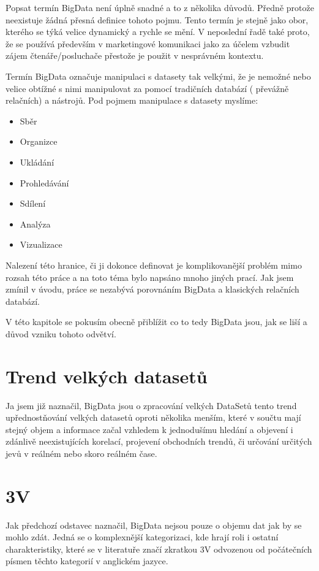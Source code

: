 

Popsat termín BigData není úplně snadné a to z několika důvodů. Předně protože neexistuje žádná přesná definice tohoto pojmu. Tento termín je stejně jako obor, kterého se týká velice dynamický a rychle se mění. V neposlední řadě také proto, že se používá především v marketingové komunikaci jako  za účelem vzbudit zájem čtenáře/posluchače přestože je použit v nesprávném kontextu.

Termín BigData označuje manipulaci s datasety tak velkými, že je nemožné nebo velice obtížné  s nimi manipulovat za pomocí tradičních databází ( převážně relačních) a nástrojů. Pod pojmem manipulace s datasety myslíme:

\begin{itemize}
  \item Sběr
  \item Organizce
  \item Ukládání
 \item Prohledávání
 \item Sdílení
 \item Analýza
 \item Vizualizace
\end{itemize}

Nalezení této hranice, či ji dokonce definovat je komplikovanější problém mimo rozsah této práce a na toto téma bylo napsáno mnoho jiných prací. Jak jsem zmínil v úvodu, práce se nezabývá porovnáním BigData a klasických relačních databází. 

V této kapitole se pokusím obecně přiblížit co to tedy BigData jsou, jak se liší a důvod vzniku tohoto odvětví.


\section{Trend velkých datasetů}
Ja jsem již naznačil, BigData jsou o zpracování velkých DataSetů tento trend upřednostňování velkých datasetů oproti několika menším, které v součtu mají stejný objem a informace začal vzhledem k jednodušímu hledání a objevení i zdánlivě neexistujících korelací, projevení obchodních trendů, či určování určitých jevů v reálném nebo skoro reálném čase. 

\section{3V}
Jak předchozí odstavec naznačil, BigData nejsou pouze o objemu dat jak by se mohlo zdát. Jedná se o komplexnější kategorizaci, kde hrají roli i ostatní charakteristiky, které se v literatuře značí zkratkou 3V odvozenou od počátečních písmen těchto kategorií v anglickém jazyce. 

